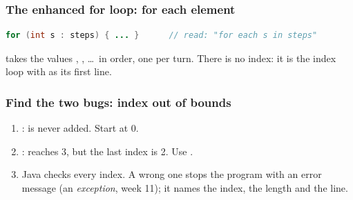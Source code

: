 \documentclass[aspectratio=169,10pt,compress]{beamer}
\begin{document}
\begin{frame}[t,fragile] \frametitle{The enhanced for loop: for each element}


\begin{lstlisting}[style=codesnippet, language=Java]
for (int s : steps) { ... }      // read: "for each s in steps"
\end{lstlisting}


	\footnotesize {} takes the values , , \dots\ in order, one per turn.
	There is no index: it is the index loop with  as its first line.


	\footnotesize {}
\end{frame}




\begin{frame}[t,fragile] \frametitle{Find the two bugs: index out of bounds}
	\footnotesize {}


	\begin{enumerate}\footnotesize
		\item<3-> :  is never added. Start at 0.
		\item<3-> :  reaches 3, but the last index is 2. Use \hCode{<}.
		\item[]<3-> Java checks every index. A wrong one stops the program with an error message
			  (an \emph{exception}, week 11); it names the index, the length and the line.
	\end{enumerate}
\end{frame}
\end{document}
